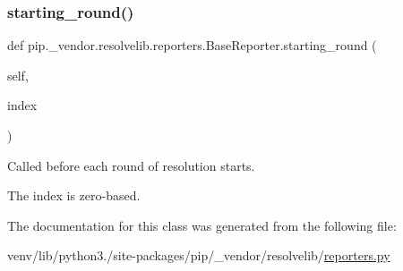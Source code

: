 \subsubsection{\texorpdfstring{starting\+\_\+round()}{starting\_round()}}
{\footnotesize\ttfamily def pip.\+\_\+vendor.\+resolvelib.\+reporters.\+Base\+Reporter.\+starting\+\_\+round (\begin{DoxyParamCaption}\item[{}]{self,  }\item[{}]{index }\end{DoxyParamCaption})}

\begin{DoxyVerb}Called before each round of resolution starts.

The index is zero-based.
\end{DoxyVerb}
 

The documentation for this class was generated from the following file\+:\begin{DoxyCompactItemize}
\item 
venv/lib/python3./site-\/packages/pip/\+\_\+vendor/resolvelib/\hyperlink{reporters_8py}{reporters.\+py}\end{DoxyCompactItemize}
